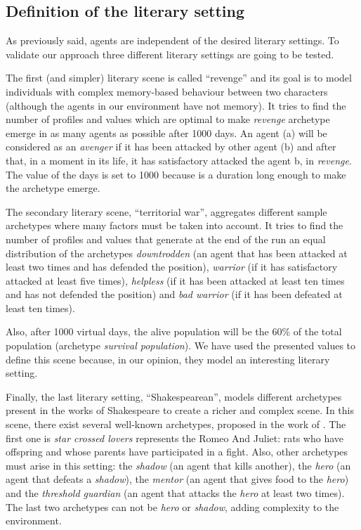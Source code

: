\documentclass[letterpaper]{article}
\begin{document}
\subsection{Definition of the literary setting}

As previously said, agents are independent of the desired literary settings. To validate our approach three different literary settings are going to be tested.

The first (and simpler) literary scene is called ``revenge'' and its goal is to model individuals with complex memory-based behaviour between two characters (although the agents in our environment have not memory). It tries to find the number of profiles and values which are optimal to make \textit{revenge} archetype emerge in as many agents as possible after 1000 days.  An agent (a) will be considered as an \textit{avenger} if it has been attacked by other agent (b) and after that, in a moment in its life, it has satisfactory attacked the agent b, in \textit{revenge}. The value of the days is set to 1000 because is a duration long enough to make the archetype emerge. 

The secondary literary scene, ``territorial war'', aggregates different sample archetypes where many factors must be taken into account.  It tries to find the number of profiles and values that generate at the end of the run an equal distribution of the archetypes \textit{downtrodden} (an agent that has been attacked at least two times and has defended the position), \textit{warrior} (if it has satisfactory attacked at least five times), \textit{helpless} (if it has been attacked at least ten times and has not defended the position) and \textit{bad warrior} (if it has been defeated at least ten times).

 Also,  after 1000 virtual days, the alive population will be the 60\% of the total population (archetype \textit{survival population}). We have used the presented values to define this scene because, in our opinion, they model an interesting literary setting. 

Finally, the last literary setting, ``Shakespearean'', models different archetypes present in the works of Shakespeare to create a richer and complex scene. In this scene, there exist several well-known archetypes, proposed in the work of \cite{vogler1998writer}. The first one is \textit{star crossed lovers} represents the Romeo And Juliet: rats who have offspring and whose parents have participated in a fight. Also, other archetypes must arise in this setting: the \textit{shadow} (an agent that kills another), the \textit{hero} (an agent that defeats a \textit{shadow}), the \textit{mentor} (an agent that gives food to the \textit{hero}) and the \textit{threshold guardian} (an agent that attacks the \textit{hero} at least two times). The last two archetypes can not be \textit{hero} or \textit{shadow}, adding complexity to the environment.
\end{document}
